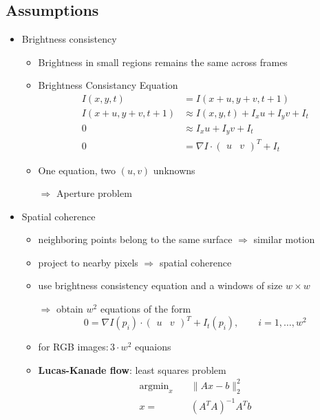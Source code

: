 \documentclass[12pt]{article}
\DeclareMathOperator*{\argmin}{arg min}
\begin{document}
	\subsection{Assumptions}
	\begin{itemize}
		\item Brightness consistency
			\begin{itemize}
				\item Brightness in small regions remains the same across frames
				\item Brightness Consistancy Equation
					\begin{align}
						I(x,y,t) &= I(x + u, y + v, t + 1) \\
						I(x + u, y + v, t + 1) &\approx I(x,y,t) + I_xu + I_yv + I_t \\
						0 &\approx I_xu + I_yv + I_t \\
						0 &= \nabla I \cdot \begin{pmatrix} u & v \end{pmatrix}^T + I_t
					\end{align}
				\item One equation, two $(u, v)$ unknowns
				\item[$\Rightarrow$] Aperture problem
			\end{itemize}
		\item Spatial coherence
			\begin{itemize}
				\item neighboring points belong to the same surface $\Rightarrow$ similar motion
				\item project to nearby pixels $\Rightarrow$ spatial coherence
				\item use brightness consistency equation and a windows of size $w \times w$
				\item[$\Rightarrow$] obtain $w^2$ equations of the form
					\begin{equation}
						0 = \nabla I(p_i) \cdot \begin{pmatrix} u & v \end{pmatrix}^T + I_t(p_i), \qquad i = 1, \dots, w^2
					\end{equation}
				\item for RGB images$\colon 3\cdot w^2$ equaions
				\item \textbf{Lucas-Kanade flow}: least squares problem
					\begin{align}
						\argmin_x \quad &\|Ax - b\|_2^2 \\
						x = &(A^T A)^{-1}A^Tb
					\end{align}

\end{itemize}
\end{itemize}
\end{document}
